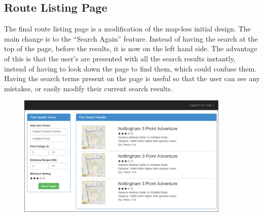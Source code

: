 \documentclass[a4paper,twoside,notitlepage,11pt]{article}
\begin{document}
\subsection{Route Listing Page}
The final route listing page is a modification of the map-less initial design. The main change is to the ``Search Again'' feature. Instead of having the search at the top of the page, before the results, it is now on the left hand side. The advantage of this is that the user's are presented with all the search results instantly, instead of having to look down the page to find them, which could confuse them. Having the search terms present on the page is useful so that the user can see any mistakes, or easily modify their current search results.
 \begin{figure}[!ht]
 	\begin{center}
 		\includegraphics[width=0.9\textwidth]{images/final/listing.png}
 	\end{center}
 	\vspace{-6mm}
 \end{figure}

\newpage
\end{document}
